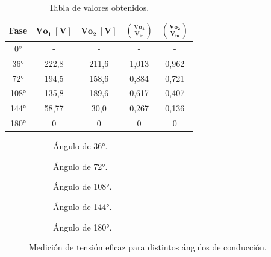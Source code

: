 \begin{table}[H]
\centering
  \begin{tabular}{|c|c|c|c|c|}
    \hline
      \textbf{Fase} & $\mathbf{Vo_1~[V]}$ & $\mathbf{Vo_2~[V]}$ & $\mathbf{(\frac{Vo_1}{V_{in}})}$ & $\mathbf{(\frac{Vo_2}{V_{in}})}$ \\
    \hline
      0°    & -       & -       & -       & -           \\
      36°   & 222,8   & 211,6   & 1,013   & 0,962\\
      72°   & 194,5   & 158,6   & 0,884   & 0,721\\
      108°  & 135,8   & 189,6   & 0,617   & 0,407\\
      144°  & 58,77   & 30,0    & 0,267   & 0,136\\
      180°  & 0       & 0       & 0       & 0\\
    \hline
  \end{tabular}
\caption{Tabla de valores obtenidos.}
\label{tab:TablaExp2}
\end{table}

      \begin{figure}[H]
        \centering
        \begin{subfigure}[ht]{0.48\textwidth}
          \caption{Ángulo de 36°.}
        \end{subfigure}
        \hfill 
        \begin{subfigure}[ht]{0.48\textwidth}
          \caption{Ángulo de 72°.}
        \end{subfigure}
        \begin{subfigure}[ht]{0.48\textwidth}
          \caption{Ángulo de 108°.}
        \end{subfigure}
        \hfill 
        \begin{subfigure}[ht]{0.48\textwidth}
          \caption{Ángulo de 144°.}
        \end{subfigure}
        \begin{subfigure}[ht]{0.48\textwidth}
          \caption{Ángulo de 180°.}
        \end{subfigure}

        \caption{Medición de tensión eficaz para distintos ángulos de conducción.}
         \label{fig:MedicionAnguloConduccion}
      \end{figure}

